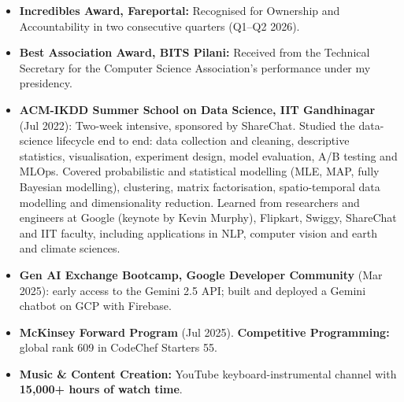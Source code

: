 \documentclass[a4paper,10pt]{extarticle}
\begin{document}
\begin{itemize}
    \item \textbf{Incredibles Award, Fareportal:} Recognised for Ownership and Accountability in two consecutive quarters (Q1--Q2 2026).

    \item \textbf{Best Association Award, BITS Pilani:} Received from the Technical Secretary for the Computer Science Association's performance under my presidency.

    \item \textbf{ACM-IKDD Summer School on Data Science, IIT Gandhinagar} (Jul 2022): Two-week intensive, sponsored by ShareChat. Studied the data-science lifecycle end to end: data collection and cleaning, descriptive statistics, visualisation, experiment design, model evaluation, A/B testing and MLOps. Covered probabilistic and statistical modelling (MLE, MAP, fully Bayesian modelling), clustering, matrix factorisation, spatio-temporal data modelling and dimensionality reduction. Learned from researchers and engineers at Google (keynote by Kevin Murphy), Flipkart, Swiggy, ShareChat and IIT faculty, including applications in NLP, computer vision and earth and climate sciences.

    \item \textbf{Gen AI Exchange Bootcamp, Google Developer Community} (Mar 2025): early access to the Gemini 2.5 API; built and deployed a Gemini chatbot on GCP with Firebase.

    \item \textbf{McKinsey Forward Program} (Jul 2025). \textbf{Competitive Programming:} global
    rank 609 in CodeChef Starters 55.

    \item \textbf{Music \& Content Creation:} YouTube keyboard-instrumental channel with
    \textbf{15,000+ hours of watch time}.
\end{itemize}
\end{document}

